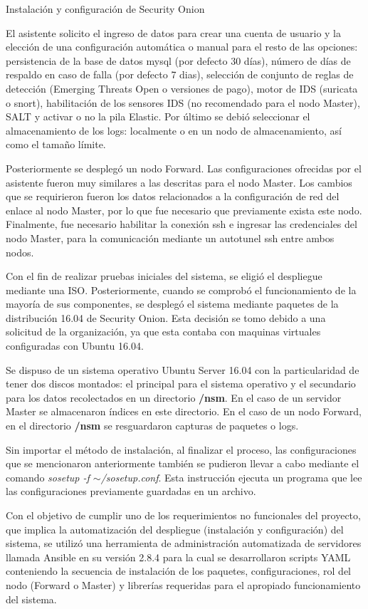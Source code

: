 \begin{section}{Instalación y configuración de Security Onion}
\begin{figure}[H]
            \label{fig:figura_38_b_sonion_modo}
        \end{figure}
        El asistente solicito el ingreso de datos para crear una cuenta de usuario y la elección de una configuración automática o manual para el resto de las opciones: persistencia de la base de datos mysql (por defecto 30 días), número de días de respaldo en caso de falla (por defecto 7 dias), selección de conjunto de reglas de detección (Emerging Threats Open o versiones de pago), motor de IDS (suricata o snort), habilitación de los sensores IDS (no recomendado para el nodo Master), SALT y activar o no la pila Elastic. Por último se debió seleccionar el almacenamiento de los logs: localmente o en un nodo de almacenamiento, así como el tamaño límite.\par
        Posteriormente se desplegó un nodo Forward. Las configuraciones ofrecidas por el asistente fueron muy similares a las descritas para el nodo Master. Los cambios que se requirieron fueron los datos relacionados a la configuración de red del enlace al nodo Master, por lo que fue necesario que previamente exista este nodo. Finalmente, fue necesario habilitar la conexión ssh e ingresar las credenciales del nodo Master, para la comunicación mediante un autotunel ssh entre ambos nodos.\par
        Con el fin de realizar pruebas iniciales del sistema, se eligió el despliegue mediante una ISO. Posteriormente, cuando se comprobó el funcionamiento de la mayoría de sus componentes, se desplegó el sistema mediante paquetes de la distribución 16.04 de Security Onion. Esta decisión se tomo debido a una solicitud de la organización, ya que esta contaba con maquinas virtuales configuradas con Ubuntu 16.04. \par
        Se dispuso de un sistema operativo Ubuntu Server 16.04 con la particularidad de tener dos discos montados: el principal para el sistema operativo y el secundario para los datos recolectados en un directorio \textbf{/nsm}. En el caso de un servidor Master se almacenaron índices en este directorio. En el caso de un nodo Forward, en el directorio \textbf{/nsm} se resguardaron capturas de paquetes o logs. \par 
        Sin importar el método de instalación, al finalizar el proceso, las configuraciones que se mencionaron anteriormente también se pudieron llevar a cabo mediante el comando \textit{sosetup -f $\sim$/sosetup.conf}. Esta instrucción ejecuta un programa que lee las configuraciones previamente guardadas en un archivo.\par
        Con el objetivo de cumplir uno de los requerimientos no funcionales del proyecto, que implica la automatización del despliegue (instalación y configuración) del sistema, se utilizó una herramienta de administración automatizada de servidores llamada Ansible en su versión 2.8.4 para la cual se desarrollaron scripts YAML conteniendo la secuencia de instalación de los paquetes, configuraciones, rol del nodo (Forward o Master) y librerías requeridas para el apropiado funcionamiento del sistema.\par
        \end{section}
        
